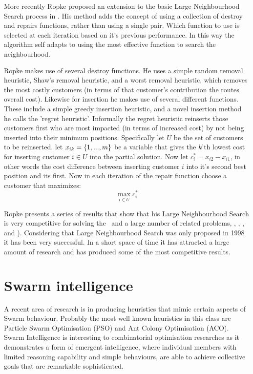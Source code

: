 More recently Ropke proposed an extension to the basic Large Neighbourhood Search process in \cite{Ropke:2005}. His method adds the concept of using a collection of destroy and repairs functions, rather than using a single pair. Which function to use is selected at each iteration based on it's previous performance. In this way the algorithm self adapts to using the most effective function to search the neighbourhood. 

Ropke makes use of several destroy functions. He uses a simple random removal heuristic, Shaw's removal heuristic, and a worst removal heuristic, which removes the most costly customers (in terms of that customer's contribution the routes overall cost). Likewise for insertion he makes use of several different functions. These include a simple greedy insertion heuristic, and a novel insertion method he calls the 'regret heuristic'. Informally the regret heuristic reinserts those customers first who are most impacted (in terms of increased cost) by not being inserted into their minimum positions. Specifically let $U$ be the set of customers to be reinserted. let $x_{ik} = \{1,...,m\}$ be a variable that gives the $k$'th lowest cost for inserting customer $i \in U$ into the partial solution. Now let $c_i^* = x_{i2} - x_{i1}$, in other words the cost difference between inserting customer $i$ into it's second best position and its first. Now in each iteration of the repair function choose a customer that maximizes:
\[
   \operatorname*{max}_{i \in U} c_i^*
\]

Ropke presents a series of results that show that his Large Neighbourhood Search is very competitive for solving the \VRP\ and a large number of related problems, \CVRP, \VRPTW, \PDPTW, and \DARP). Considering that Large Neighbourhood Search was only proposed in 1998 it has been very successful. In a short space of time it has attracted a large amount of research and has produced some of the most competitive results.

\section{Swarm intelligence}
\label{sec:si}

A recent area of research is in producing heuristics that mimic certain aspects of Swarm behaviour. Probably the most well known heuristics in this class are Particle Swarm Optimisation (PSO) and Ant Colony Optimisation (ACO). Swarm Intelligence is interesting to combinatorial optimisation researches as it demonstrates a form of emergent intelligence, where individual members with limited reasoning capability and simple behaviours, are able to achieve collective goals that are remarkable sophisticated.

